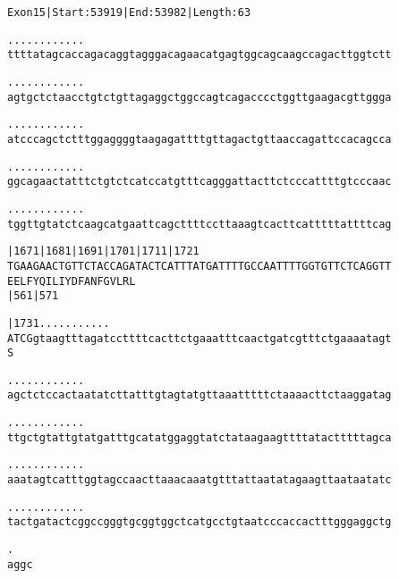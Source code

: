 \documentclass{article}
\begin{document}
\begin{alltt}
Exon 15 | Start: 53919 | End: 53982 | Length: 63

.    .    .    .    .    .    .    .    .    .    .    .    
ttttatagcaccagacaggtagggacagaacatgagtggcagcaagccagacttggtctt

.    .    .    .    .    .    .    .    .    .    .    .    
agtgctctaacctgtctgttagaggctggccagtcagacccctggttgaagacgttggga

.    .    .    .    .    .    .    .    .    .    .    .    
atcccagctctttggaggggtaagagattttgttagactgttaaccagattccacagcca

.    .    .    .    .    .    .    .    .    .    .    .    
ggcagaactatttctgtctcatccatgtttcagggattacttctcccattttgtcccaac

.    .    .    .    .    .    .    .    .    .    .    .    
tggttgtatctcaagcatgaattcagcttttccttaaagtcacttcatttttattttcag

   |1671     |1681     |1691     |1701     |1711     |1721  
TGAAGAACTGTTCTACCAGATACTCATTTATGATTTTGCCAATTTTGGTGTTCTCAGGTT
 E  E  L  F  Y  Q  I  L  I  Y  D  F  A  N  F  G  V  L  R  L 
             |561                          |571             

   |1731.    .    .    .    .    .    .    .    .    .    . 
ATCGgtaagtttagatccttttcacttctgaaatttcaactgatcgtttctgaaaatagt
 S                                                          

   .    .    .    .    .    .    .    .    .    .    .    . 
agctctccactaatatcttatttgtagtatgttaaatttttctaaaacttctaaggatag

   .    .    .    .    .    .    .    .    .    .    .    . 
ttgctgtattgtatgatttgcatatggaggtatctataagaagttttatactttttagca

   .    .    .    .    .    .    .    .    .    .    .    . 
aaatagtcatttggtagccaacttaaacaaatgtttattaatatagaagttaataatatc

   .    .    .    .    .    .    .    .    .    .    .    . 
tactgatactcggccgggtgcggtggctcatgcctgtaatcccaccactttgggaggctg

   .
aggc
\end{alltt}
\newpage
\end{document}
